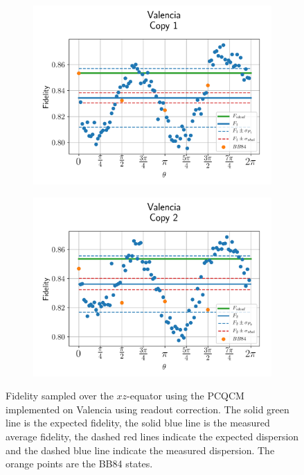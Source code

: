 \begin{figure}[H]
  \centering
  \begin{subfigure}{.5\textwidth}
    \centering
    \includegraphics[width=\textwidth]{Figures/PhaseCovariant/IBM/OnlyEquator/results_corrected_valencia_copy1.png}
    \label{fig:pc_corrected_valencia_equator_1}
  \end{subfigure}%
  \begin{subfigure}{.5\textwidth}
    \centering
    \includegraphics[width=\textwidth]{Figures/PhaseCovariant/IBM/OnlyEquator/results_corrected_valencia_copy2.png}
    \label{fig:pc_corrected_valencia_equator_2}
  \end{subfigure}
  \vspace{-0.5cm}
  \caption{Fidelity sampled over the $xz$-equator using the PCQCM implemented on Valencia using readout correction. The solid green line is the expected fidelity, the solid blue line is the measured average fidelity, the dashed red lines indicate the expected dispersion and the dashed blue line indicate the measured dispersion. The orange points are the BB84 states.}
  \label{fig:pc_corrected_valencia_equator}
\end{figure}


